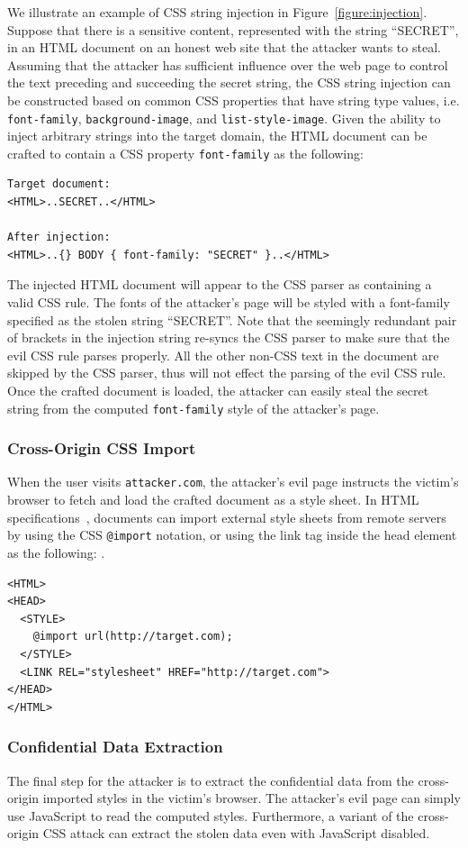 \documentclass{acm_proc_article-sp}
\begin{document}
We illustrate an example of CSS string injection in Figure~\ref{figure:injection}. Suppose that there is a sensitive content, represented with the string ``SECRET'', in an HTML document on an honest web site that the attacker wants to steal. Assuming that the attacker has sufficient influence over the web page to control the text preceding and succeeding the secret string, the CSS string injection can be constructed based on common CSS properties that have string type values, i.e. \texttt{font-family}, \texttt{background-image}, and \texttt{list-style-image}. Given the ability to inject arbitrary strings into the target domain, the HTML document can be crafted to contain a CSS property \texttt{font-family} as the following:
\begin{verbatim}
Target document:
<HTML>..SECRET..</HTML>

After injection:
<HTML>..{} BODY { font-family: "SECRET" }..</HTML>
\end{verbatim}
The injected HTML document will appear to the CSS parser as containing a valid CSS rule. The fonts of the attacker's page will be styled with a font-family specified as the stolen string ``SECRET''. Note that the seemingly redundant pair of brackets in the injection string re-syncs the CSS parser to make sure that the evil CSS rule parses properly. All the other non-CSS text in the document are skipped by the CSS parser, thus will not effect the parsing of the evil CSS rule. Once the crafted document is loaded, the attacker can easily steal the secret string from the computed \texttt{font-family} style of the attacker's page.

\subsubsection{Cross-Origin CSS Import}
When the user visits \texttt{attacker.com}, the attacker's evil page instructs the victim's browser to fetch and load the crafted document as a style sheet. In HTML specifications~\cite{html}, documents can import external style sheets from remote servers by using the CSS \texttt{@import} notation, or using the link tag inside the head element as the following: .
\begin{verbatim}
<HTML>
<HEAD>
  <STYLE>
    @import url(http://target.com);
  </STYLE>
  <LINK REL="stylesheet" HREF="http://target.com">
</HEAD>
</HTML>
\end{verbatim}

\subsubsection{Confidential Data Extraction}
The final step for the attacker is to extract the confidential data from the cross-origin imported styles in the victim's browser. The attacker's evil page can simply use JavaScript to read the computed styles. Furthermore, a variant of the cross-origin CSS attack
can extract the stolen data even with JavaScript disabled.
\end{document}
